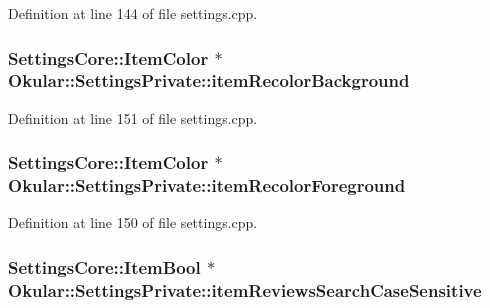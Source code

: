 Definition at line 144 of file settings.\+cpp.

\hypertarget{classOkular_1_1SettingsPrivate_a50f9f6fcd91ced5f63d0790d0a8e62df}{
\subsubsection[{item\+Recolor\+Background}]{\setlength{\rightskip}{0pt plus 5cm}Settings\+Core\+::\+Item\+Color $\ast$ Okular\+::\+Settings\+Private\+::item\+Recolor\+Background}}\label{classOkular_1_1SettingsPrivate_a50f9f6fcd91ced5f63d0790d0a8e62df}


Definition at line 151 of file settings.\+cpp.

\hypertarget{classOkular_1_1SettingsPrivate_a31381738b83f17a0f015465f4757b892}{
\subsubsection[{item\+Recolor\+Foreground}]{\setlength{\rightskip}{0pt plus 5cm}Settings\+Core\+::\+Item\+Color $\ast$ Okular\+::\+Settings\+Private\+::item\+Recolor\+Foreground}}\label{classOkular_1_1SettingsPrivate_a31381738b83f17a0f015465f4757b892}


Definition at line 150 of file settings.\+cpp.

\hypertarget{classOkular_1_1SettingsPrivate_a205618e6d9770cb40fa7073561cf1bff}{
\subsubsection[{item\+Reviews\+Search\+Case\+Sensitive}]{\setlength{\rightskip}{0pt plus 5cm}Settings\+Core\+::\+Item\+Bool $\ast$ Okular\+::\+Settings\+Private\+::item\+Reviews\+Search\+Case\+Sensitive}}\label{classOkular_1_1SettingsPrivate_a205618e6d9770cb40fa7073561cf1bff}


